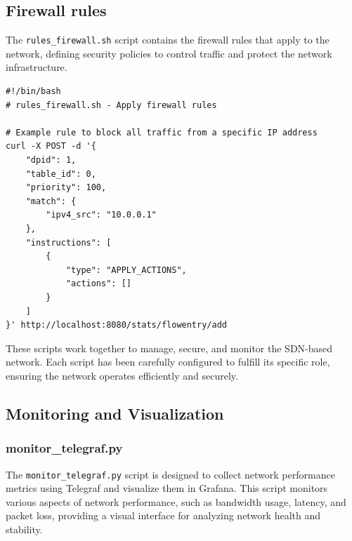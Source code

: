 \documentclass[a4paper,12pt]{article}
\begin{document}
\subsection{Firewall rules}
The \texttt{rules\_firewall.sh} script contains the firewall rules that apply to the network, defining security policies to control traffic and protect the network infrastructure.

\begin{verbatim}
#!/bin/bash
# rules_firewall.sh - Apply firewall rules

# Example rule to block all traffic from a specific IP address
curl -X POST -d '{
    "dpid": 1,
    "table_id": 0,
    "priority": 100,
    "match": {
        "ipv4_src": "10.0.0.1"
    },
    "instructions": [
        {
            "type": "APPLY_ACTIONS",
            "actions": []
        }
    ]
}' http://localhost:8080/stats/flowentry/add
\end{verbatim}

These scripts work together to manage, secure, and monitor the SDN-based network. Each script has been carefully configured to fulfill its specific role, ensuring the network operates efficiently and securely.

\subsection{Monitoring and Visualization}

\subsubsection{monitor\_telegraf.py}
The \texttt{monitor\_telegraf.py} script is designed to collect network performance metrics using Telegraf and visualize them in Grafana. This script monitors various aspects of network performance, such as bandwidth usage, latency, and packet loss, providing a visual interface for analyzing network health and stability.
\end{document}
